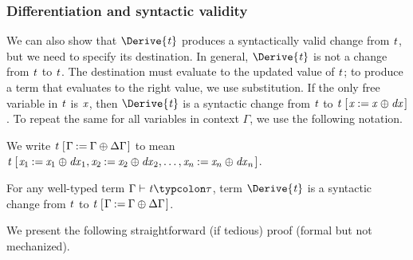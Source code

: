 \subsubsection{Differentiation and syntactic validity}
We can also show that \ensuremath{\Derive{\Varid{t}}} produces a syntactically valid
change from \ensuremath{\Varid{t}}, but we need to specify its destination.
In general, \ensuremath{\Derive{\Varid{t}}} is not a change from \ensuremath{\Varid{t}} to \ensuremath{\Varid{t}}. The
destination must evaluate to the updated value of \ensuremath{\Varid{t}}; to produce
a term that evaluates to the right value, we use substitution. If
the only free variable in \ensuremath{\Varid{t}} is \ensuremath{\Varid{x}}, then \ensuremath{\Derive{\Varid{t}}} is a
syntactic change from \ensuremath{\Varid{t}} to \ensuremath{\Varid{t}\;[\mskip1.5mu \Varid{x}\mathbin{:=}\Varid{x}\oplus \Varid{dx}\mskip1.5mu]}.
To repeat the same for all variables in context \ensuremath{\Gamma}, we use
the following notation.
\begin{notation}
We write \ensuremath{\Varid{t}\;[\mskip1.5mu \Gamma\mathbin{:=}\Gamma\oplus \Delta \Gamma\mskip1.5mu]} to mean \ensuremath{\Varid{t}\;[\mskip1.5mu \Varid{x}_{1}\mathbin{:=}\Varid{x}_{1}\oplus \Varid{dx}_{1},\Varid{x}_{2}\mathbin{:=}\Varid{x}_{2}\oplus \Varid{dx}_{2},\ldots,\Varid{x}_n\mathbin{:=}\Varid{x}_n\oplus \Varid{dx}_n\mskip1.5mu]}.
\end{notation}
\begin{theorem}
  \label{thm:derive-correct-syntactic}
  For any well-typed term \ensuremath{\Gamma\vdash\Varid{t}\typcolon\tau}, term \ensuremath{\Derive{\Varid{t}}} is
  a syntactic change from \ensuremath{\Varid{t}} to \ensuremath{\Varid{t}\;[\mskip1.5mu \Gamma\mathbin{:=}\Gamma\oplus \Delta \Gamma\mskip1.5mu]}.
\end{theorem}
We present the following straightforward (if tedious) proof (formal but not mechanized).
